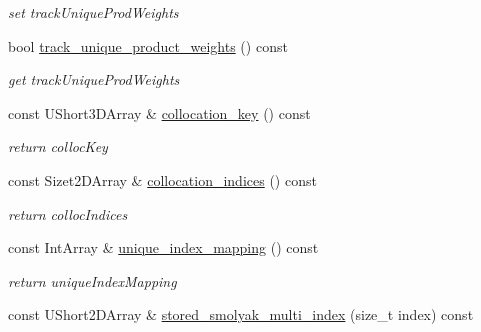 \begin{DoxyCompactItemize}
\begin{DoxyCompactList}\small\item\em set track\+Unique\+Prod\+Weights \end{DoxyCompactList}\item 
bool \hyperlink{classPecos_1_1CombinedSparseGridDriver_ab200b1697f65bab5112a5aeb55825087}{track\+\_\+unique\+\_\+product\+\_\+weights} () const \label{classPecos_1_1CombinedSparseGridDriver_ab200b1697f65bab5112a5aeb55825087}

\begin{DoxyCompactList}\small\item\em get track\+Unique\+Prod\+Weights \end{DoxyCompactList}\item 
const U\+Short3\+D\+Array \& \hyperlink{classPecos_1_1CombinedSparseGridDriver_a7ee1a2b4537ebad12a0ffff2070af78c}{collocation\+\_\+key} () const \label{classPecos_1_1CombinedSparseGridDriver_a7ee1a2b4537ebad12a0ffff2070af78c}

\begin{DoxyCompactList}\small\item\em return colloc\+Key \end{DoxyCompactList}\item 
const Sizet2\+D\+Array \& \hyperlink{classPecos_1_1CombinedSparseGridDriver_af9d9e61e6d7dc9db34323f5a6c7cbd1f}{collocation\+\_\+indices} () const \label{classPecos_1_1CombinedSparseGridDriver_af9d9e61e6d7dc9db34323f5a6c7cbd1f}

\begin{DoxyCompactList}\small\item\em return colloc\+Indices \end{DoxyCompactList}\item 
const Int\+Array \& \hyperlink{classPecos_1_1CombinedSparseGridDriver_a1b2b5d6dd1639a93b360a614f38b8a79}{unique\+\_\+index\+\_\+mapping} () const \label{classPecos_1_1CombinedSparseGridDriver_a1b2b5d6dd1639a93b360a614f38b8a79}

\begin{DoxyCompactList}\small\item\em return unique\+Index\+Mapping \end{DoxyCompactList}\item 
const U\+Short2\+D\+Array \& \hyperlink{classPecos_1_1CombinedSparseGridDriver_a412d778f5f7e6c19c8bca56f877939ee}{stored\+\_\+smolyak\+\_\+multi\+\_\+index} (size\+\_\+t index) const \label{classPecos_1_1CombinedSparseGridDriver_a412d778f5f7e6c19c8bca56f877939ee}


\end{DoxyCompactItemize}
